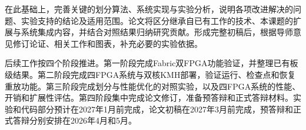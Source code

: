 在此基础上，完善关键的划分算法、系统实现与实验分析，说明各项改进解决的问题、实验支持的结论及适用范围。论文将区分继承自已有工作的技术、本课题的扩展与系统集成内容，并结合对照结果归纳研究贡献。形成完整初稿后，根据导师意见修订论证、相关工作和图表，补充必要的实验依据。

后续工作按四个阶段推进。第一阶段完成Fabric双FPGA功能验证，并整理已有板级结果。第二阶段完成四FPGA系统与双核KMH部署，验证运行、检查点和恢复重放功能。第三阶段完成划分与性能优化的对照实验，以及四FPGA系统的性能、开销和扩展性评估。第四阶段集中完成论文修订，准备预答辩和正式答辩材料。实验和代码部分预计在2027年1月前完成，论文初稿在2027年3月前完成，预答辩和正式答辩分别安排在2026年4月和5月。
